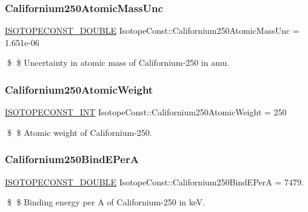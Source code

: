 \subsubsection{\texorpdfstring{Californium250\+Atomic\+Mass\+Unc}{Californium250AtomicMassUnc}}
{\footnotesize\ttfamily \mbox{\hyperlink{group___isotope_const-_macros_ga8f45a7272ce02c0b4c65c44636ed719a}{I\+S\+O\+T\+O\+P\+E\+C\+O\+N\+S\+T\+\_\+\+D\+O\+U\+B\+LE}} Isotope\+Const\+::\+Californium250\+Atomic\+Mass\+Unc = 1.\+651e-\/06}

\$ \$ Uncertainty in atomic mass of Californium-\/250 in amu. \mbox{\label{group___isotope_const-_californium-_cf250_ga975d6fed8a64a4427c8cd844b970c66a}} 
\subsubsection{\texorpdfstring{Californium250\+Atomic\+Weight}{Californium250AtomicWeight}}
{\footnotesize\ttfamily \mbox{\hyperlink{group___isotope_const-_macros_ga5f18360b3e99483a35c32d789e62621c}{I\+S\+O\+T\+O\+P\+E\+C\+O\+N\+S\+T\+\_\+\+I\+NT}} Isotope\+Const\+::\+Californium250\+Atomic\+Weight = 250}

\$ \$ Atomic weight of Californium-\/250. \mbox{\label{group___isotope_const-_californium-_cf250_ga158781b72911f8c762aecef6fd89b834}} 
\subsubsection{\texorpdfstring{Californium250\+Bind\+E\+PerA}{Californium250BindEPerA}}
{\footnotesize\ttfamily \mbox{\hyperlink{group___isotope_const-_macros_ga8f45a7272ce02c0b4c65c44636ed719a}{I\+S\+O\+T\+O\+P\+E\+C\+O\+N\+S\+T\+\_\+\+D\+O\+U\+B\+LE}} Isotope\+Const\+::\+Californium250\+Bind\+E\+PerA = 7479.}

\$ \$ Binding energy per A of Californium-\/250 in keV. \mbox{\label{group___isotope_const-_californium-_cf250_gaee2e8784e18ab3478fd32d97995ee31e}} 
